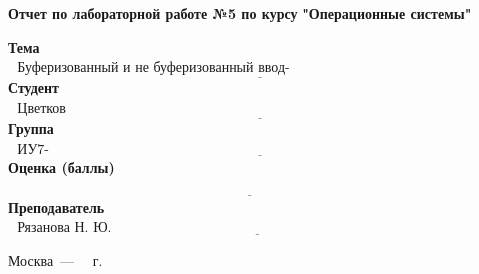 \begin{titlepage}
	\begin{center}
		\noindent\begin{minipage}{1.3\textwidth}\centering
		\Large\textbf{Отчет по лабораторной работе №5 по курсу}\newline
		\textbf{"Операционные системы"}\newline\newline\newline
		\end{minipage}
	\end{center}
	

	\noindent\textbf{Тема}           $\underline{\text{~~Буферизованный и не буферизованный ввод-вывод~~~~~~~~~~~~~~~~~~~~~~~~~~~~~~~~~~~~~~~~~~~~~~~~~~~~~~}}$\newline\newline
	\noindent\textbf{Студент}        $\underline{\text{~~Цветков И.А.~~~~~~~~~~~~~~~~~~~~~~~~~~~~~~~~~~~~~~~~~~~~~~~~~~~~~~~~~~~~~~~~~~~~~~~~~~~~~~~~~~~~~~~~~~~~~~~}}$\newline\newline
	\noindent\textbf{Группа}         $\underline{\text{~~ИУ7-63Б~~~~~~~~~~~~~~~~~~~~~~~~~~~~~~~~~~~~~~~~~~~~~~~~~~~~~~~~~~~~~~~~~~~~~~~~~~~~~~~~~~~~~~~~~~~~~~~~~~~~~~}}$\newline\newline
	\noindent\textbf{Оценка (баллы)} $\underline{\text{~~~~~~~~~~~~~~~~~~~~~~~~~~~~~~~~~~~~~~~~~~~~~~~~~~~~~~~~~~~~~~~~~~~~~~~~~~~~~~~~~~~~~~~~~~~~~~~~~~~~~~~~}}$\newline\newline
	\noindent\textbf{Преподаватель}  $\underline{\text{~~Рязанова Н. Ю.~~~~~~~~~~~~~~~~~~~~~~~~~~~~~~~~~~~~~~~~~~~~~~~~~~~~~~~~~~~~~~~~~~~~~~~~~~~~~~~~~~~~~}}$\newline	
	\begin{center}
		\vfill
		Москва~---~\the\year
		~г.
	\end{center}
	\restoregeometry
\end{titlepage}

